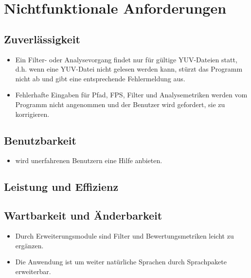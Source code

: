 \chapter{Nichtfunktionale Anforderungen}
\section{Zuverlässigkeit}
\begin{itemize}
\item Ein Filter- oder Analysevorgang findet nur für gültige YUV-Dateien statt, d.h. wenn eine YUV-Datei nicht gelesen werden kann, stürzt das Programm nicht ab und gibt eine entsprechende Fehlermeldung aus.
\item Fehlerhafte Eingaben für Pfad, FPS, Filter und Analysemetriken werden vom Programm nicht angenommen und der Benutzer wird gefordert, sie zu korrigieren.
\end{itemize}
\setcounter{counterKriterien}{0}

\section{Benutzbarkeit}
\begin{itemize}
\item \projektTitel wird unerfahrenen Benutzern eine Hilfe anbieten.
\end{itemize}

\section{Leistung und Effizienz}

\section{Wartbarkeit und Änderbarkeit}
\begin{itemize}
\item Durch Erweiterungsmodule sind Filter und Bewertungsmetriken leicht zu ergänzen.
\item Die Anwendung ist um weiter natürliche Sprachen durch Sprachpakete erweiterbar.
\end{itemize}